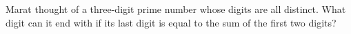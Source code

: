 Marat thought of a three-digit prime number whose digits are all distinct. What digit can it end with if its last digit is equal to the sum of the first two digits?
